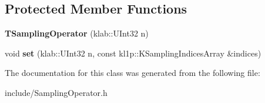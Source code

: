 \subsection*{Protected Member Functions}
\begin{DoxyCompactItemize}
\item 
{\bfseries T\+Sampling\+Operator} (klab\+::\+U\+Int32 n)\hypertarget{classkl1p_1_1TSamplingOperator_a1787268db46a60628e560e8308d221e1}{}\label{classkl1p_1_1TSamplingOperator_a1787268db46a60628e560e8308d221e1}

\item 
void {\bfseries set} (klab\+::\+U\+Int32 n, const kl1p\+::\+K\+Sampling\+Indices\+Array \&indices)\hypertarget{classkl1p_1_1TSamplingOperator_a13e815e47af41ad1ee685bf7a82fc302}{}\label{classkl1p_1_1TSamplingOperator_a13e815e47af41ad1ee685bf7a82fc302}

\end{DoxyCompactItemize}


The documentation for this class was generated from the following file\+:\begin{DoxyCompactItemize}
\item 
include/Sampling\+Operator.\+h\end{DoxyCompactItemize}
